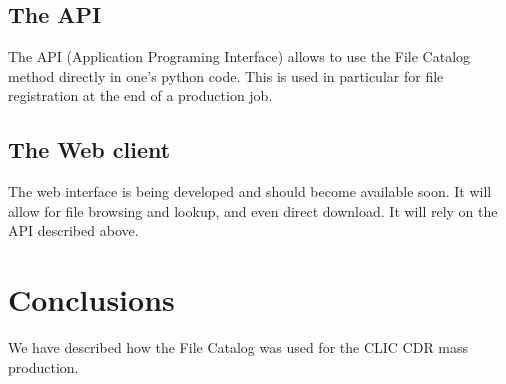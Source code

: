 \documentclass[a4paper,12pt]{article}
\begin{document}
\subsection{The API}
The API (Application Programing Interface) allows to use the File Catalog method
directly in one's python code. This is used in particular for file registration
at the end of a production job.

\subsection{The Web client}
The web interface is being developed and should become available soon. It will
allow for file browsing and lookup, and even direct download. It will rely on
the API described above.

\section{Conclusions}
We have described how the File Catalog was used for the CLIC CDR mass
production.
\end{document}
